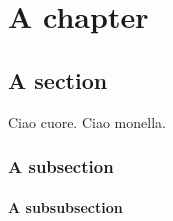 \chapter{A chapter}
\section{A section}

Ciao cuore. Ciao monella.\\

\subsection{A subsection}
\subsubsection{A subsubsection}